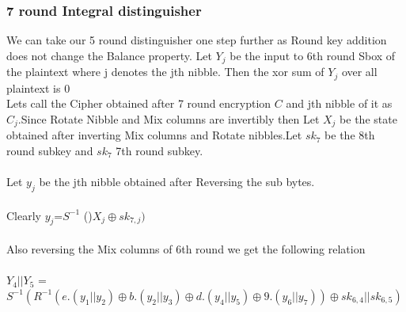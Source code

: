 \documentclass[preprint]{transcrypto}
\begin{document}
\subsubsection{7 round Integral distinguisher}

We can take our 5 round distinguisher one step further as Round key addition does not change the Balance property. Let $Y_{j}$ be the input to 6th round Sbox of the  plaintext where j denotes the jth nibble. Then the xor sum of $Y_{j}$ over all plaintext is 0 \\

Lets call the Cipher obtained after 7 round encryption $C$ and jth nibble of it as  $C_{j}$.Since Rotate Nibble and Mix columns are invertibly then Let $X_{j}$ be the state obtained after inverting Mix columns and Rotate nibbles.Let $sk_{7}$ be the 8th round subkey and $sk_{7}$ 7th round subkey. \\
\\
Let $y_{j}$ be the jth nibble obtained after Reversing the sub bytes.\\ \\ Clearly $y_{j}$=$S^{-1}$ ()$X_{j}\oplus sk_{7,j}) $ 
\\ \\
Also reversing the Mix columns of 6th round we get the following relation \\ \\
	$Y_{4}||Y_{5}$ = $S^{-1}(R^{-1}(e.(y_{1}||y_{2})\oplus b.(y_{2}||y_{3})\oplus d.(y_{4}||y_{5})\oplus9.(y_{6}|| y_{7}))
	\oplus sk_{6,4} || sk_{6,5})$
\\ \\
\end{document}
